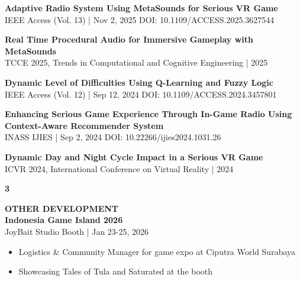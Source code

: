 \documentclass[11pt,a4paper]{article}
\begin{document}
\begin{minipage}[t]{18cm}
\begin{minipage}[t]{17cm}
\vspace{0.25cm}

\textbf{Adaptive Radio System Using MetaSounds for Serious VR Game}\\
{\small IEEE Access (Vol. 13) | Nov 2, 2025 \textbar{} DOI: 10.1109/ACCESS.2025.3627544}

\vspace{0.25cm}

\textbf{Real Time Procedural Audio for Immersive Gameplay with MetaSounds}\\
{\small TCCE 2025, Trends in Computational and Cognitive Engineering | 2025}

\vspace{0.25cm}

\textbf{Dynamic Level of Difficulties Using Q-Learning and Fuzzy Logic}\\
{\small IEEE Access (Vol. 12) | Sep 12, 2024 \textbar{} DOI: 10.1109/ACCESS.2024.3457801}

\vspace{0.25cm}

\textbf{Enhancing Serious Game Experience Through In-Game Radio Using Context-Aware Recommender System}\\
{\small INASS IJIES | Sep 2, 2024 \textbar{} DOI: 10.22266/ijies2024.1031.26}

\vspace{0.25cm}

\textbf{Dynamic Day and Night Cycle Impact in a Serious VR Game}\\
{\small ICVR 2024, International Conference on Virtual Reality | 2024}

\end{minipage}

\vspace{0.8cm}

\begin{minipage}[t]{0.8cm}
{\Large\bfseries 3}
\end{minipage}%
\begin{minipage}[t]{17cm}
{\large\bfseries OTHER DEVELOPMENT}\\[8pt]

\textbf{Indonesia Game Island 2026}\\
{\small JoyBait Studio Booth | Jan 23-25, 2026}
\begin{itemize}[leftmargin=*, nosep, itemsep=2pt, topsep=2pt]
    \item Logistics \& Community Manager for game expo at Ciputra World Surabaya
    \item Showcasing Tales of Tula and Saturated at the booth
\end{itemize}


\end{minipage}
\end{minipage}
\end{document}
